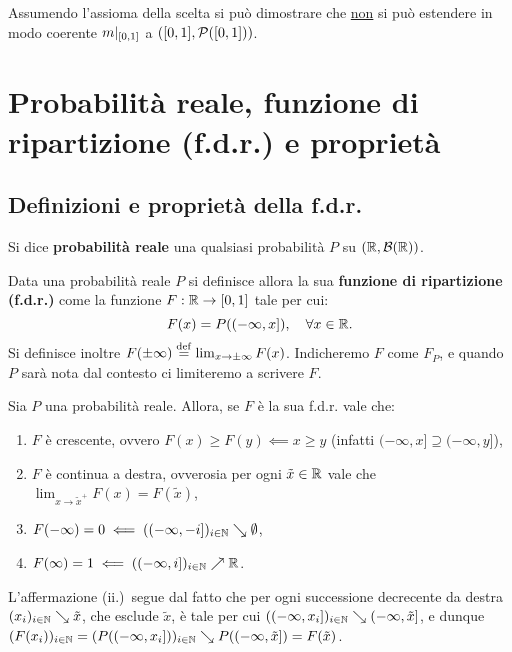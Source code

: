 \begin{multicols*}{2}
\begin{remark}
    Assumendo l'assioma della scelta si può dimostrare che \underline{non} si può estendere in modo coerente
    $m\arrowvert_{[0,1]}$ a $([0, 1], \mathcal{P}([0, 1]))$.
\end{remark}

\section{Probabilità reale, funzione di ripartizione (f.d.r.) e proprietà}

\subsection{Definizioni e proprietà della f.d.r.}

\begin{definition}
    Si dice \textbf{probabilità reale} una qualsiasi
    probabilità $P$ su $(\mathbb{R}, \mathcal{B}(\mathbb{R}))$.
\end{definition}

\begin{definition}
    Data una probabilità reale $P$ si definisce
    allora la sua \textbf{funzione di ripartizione (f.d.r.)}
    come la funzione $F : \mathbb{R} \to [0, 1]$ tale per cui:
    \[
        F(x) = P((-\infty, x]), \quad \forall x \in \mathbb{R}.
    \]
    Si definisce inoltre $F(\pm\infty) \overset{\mathrm{def}}{=} \lim_{x \to \pm\infty} F(x)$.
    Indicheremo $F$ come $F_P$, e quando $P$ sarà nota dal contesto
    ci limiteremo a scrivere $F$.
\end{definition}

\begin{proposition}
    Sia $P$ una probabilità reale. Allora, se $F$ è la
    sua f.d.r. vale che:
    \begin{enumerate}[(i.)]
        \item $F$ è crescente, ovvero $F(x) \geq F(y) \impliedby x \geq y$ (infatti $(-\infty, x] \supseteq (-\infty, y]$),
        \item $F$ è continua a destra, ovverosia per ogni $\tilde{x} \in \mathbb{R}$ vale che $\lim_{x \to \tilde{x}^+} F(x) = F(\tilde{x})$,
        \item $F(-\infty) = 0 \impliedby ((-\infty, -i])_{i \in \mathbb{N}} \searrow \emptyset$,
        \item $F(\infty) = 1 \impliedby ((-\infty, i])_{i \in \mathbb{N}} \nearrow \mathbb{R}$.
    \end{enumerate}


    L'affermazione (ii.)~segue dal fatto che per ogni successione decrecente da destra $(x_i)_{i \in \mathbb{N}} \searrow \tilde{x}$,
    che esclude $\tilde{x}$, è
    tale per cui $((-\infty, x_i])_{i \in \mathbb{N}} \searrow (-\infty, \tilde{x}]$, e dunque
    $(F(x_i))_{i \in \mathbb{N}} = (P((-\infty, x_i]))_{i \in \mathbb{N}} \searrow P((-\infty, \tilde{x}]) = F(\tilde{x})$.
\end{proposition}


\end{multicols*}
